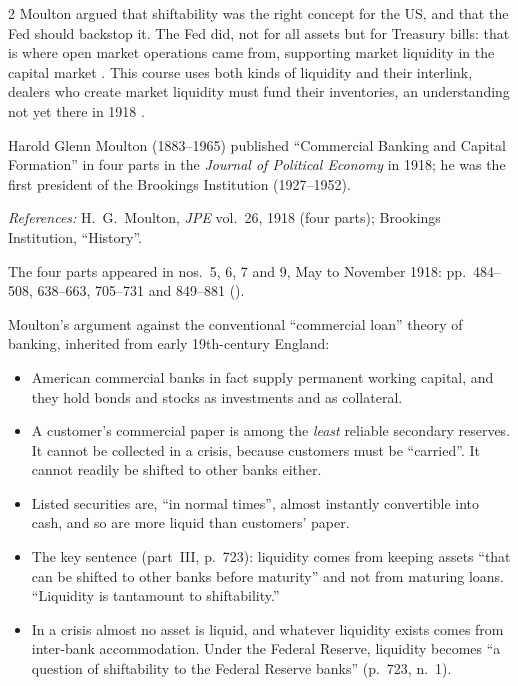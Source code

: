 \begin{paracol}{2}
Moulton argued that shiftability was the right concept for the US, and that the Fed should backstop it. The Fed did, not for all assets but for Treasury bills:
that is where open market operations came from, supporting market liquidity in the capital market . This course
uses both kinds of liquidity and their interlink, dealers who create market liquidity must fund their inventories, an understanding not yet there in 1918
.

\begin{history}
Harold Glenn Moulton (1883--1965) published ``Commercial Banking and Capital Formation'' in four parts in the \emph{Journal of Political Economy} in 1918; he
was the first president of the Brookings Institution (1927--1952).\par
\emph{References:} H.~G.~Moulton, \emph{JPE} vol.~26, 1918 (four parts); Brookings Institution, ``History''.
\end{history}

\begin{reading}
The four parts appeared in nos.~5, 6, 7 and 9, May to November 1918: pp.~484--508, 638--663, 705--731 and 849--881 ().

Moulton's argument against the conventional ``commercial loan'' theory of banking, inherited from early 19th-century England:
\begin{itemize}
  \item American commercial banks in fact supply permanent working capital, and they hold bonds and stocks as investments and as collateral.
  \item A customer's commercial paper is among the \emph{least} reliable secondary reserves. It cannot be collected in a crisis, because customers must be ``carried''. It cannot readily be shifted to other banks either.
  \item Listed securities are, ``in normal times'', almost instantly convertible into cash, and so are more liquid than customers' paper.
  \item The key sentence (part~III, p.~723): liquidity comes from keeping assets ``that can be shifted to other banks before maturity'' and not from maturing loans. ``Liquidity is tantamount to shiftability.''
  \item In a crisis almost no asset is liquid, and whatever liquidity exists comes from inter-bank accommodation. Under the Federal Reserve, liquidity becomes ``a question of shiftability to the Federal Reserve banks'' (p.~723, n.~1).
\end{itemize}
\end{reading}


\end{paracol}
